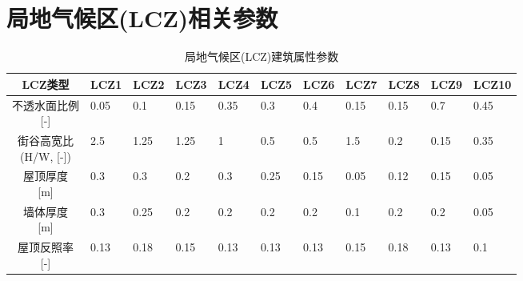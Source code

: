 \chapter{局地气候区(LCZ)相关参数}\label{局地气候区(LCZ)建筑属性参数}
\begin{landscape}
  \begin{table}[htbp]
    \footnotesize
    \centering
    \caption{局地气候区(LCZ)建筑属性参数}
    \label{tab:lcz局地气候区建筑属性参数}
    \begin{tabular}{@{}cllllllllll@{}}
      \toprule
      LCZ类型                   & LCZ1                        & LCZ2                 & LCZ3                 & LCZ4                & LCZ5                & LCZ6                & LCZ7                 & LCZ8                 & LCZ9                & LCZ10                \\ \midrule
      \makecell{不透水面比例   \\ {[-]}}                      & 0.05                 & 0.1                  & 0.15                & 0.35                & 0.3                 & 0.4                  & 0.15                 & 0.15                & 0.7                   & 0.45                 \\
      \makecell{街谷高宽比     \\ (H/W, [-])}                 & 2.5                  & 1.25                 & 1.25                & 1                   & 0.5                 & 0.5                  & 1.5                  & 0.2                 & 0.15                  & 0.35                 \\
      \makecell{屋顶厚度       \\ {[m]}}                      & 0.3                  & 0.3                  & 0.2                 & 0.3                 & 0.25                & 0.15                 & 0.05                 & 0.12                & 0.15                  & 0.05                 \\
      \makecell{墙体厚度       \\ {[m]}}                      & 0.3                  & 0.25                 & 0.2                 & 0.2                 & 0.2                 & 0.2                  & 0.1                  & 0.2                 & 0.2                   & 0.05                 \\
      \makecell{屋顶反照率     \\ {[-]}}                      & 0.13                 & 0.18                 & 0.15                & 0.13                & 0.13                & 0.13                 & 0.15                 & 0.18                & 0.13                  & 0.1                  \\

\end{tabular}
\end{table}
\end{landscape}

